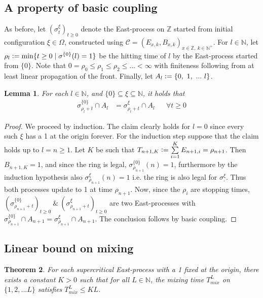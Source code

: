 \documentclass{article}
\theoremstyle{slimTheoremStyle} %
\newtheorem{theorem}{Theorem}[section]
\newtheorem{lemma}[theorem]{Lemma}
\theoremstyle{slimDefinitionStyle}
\theoremstyle{remark}
\renewcommand{\cal}[1]{\mathcal{#1}}
\newcommand{\N}{\mathbb{N}}
\newcommand{\Z}{\mathbb{Z}}
\newcommand{\defeq}{\vcentcolon=}
\begin{document}
\subsection{A property of basic coupling}
As before, let $(\sigma^\xi_t)_{t \geq 0}$ denote the East-process on $\Z$ started from initial configuration $\xi \in \Omega$, constructed using $\cal{C} = (E_{x,k}, B_{x,k})_{x \in \Z,\ k \in \N^+}$. For $l \in \N$, let $\rho_l \defeq \min\{ t \geq 0 \mid \sigma^{\{0\}}(l) = 1\}$ be the hitting time of $l$ by the East-process started from $\{ 0 \}$. Note that $0 = \rho_0 \leq \rho_1 \leq \rho_2 \leq ... < \infty$ with finiteness following from at least linear propagation of the front. Finally, let $A_l \defeq \{0,\ 1,\ ...\ l \}$.  

\begin{lemma}\label{lem:East_linear_coupling}
For each $l \in \N$, and $\{0\} \subseteq \xi \subseteq \N$, it holds that 
\begin{align}
\sigma^{\{0\}}_{\rho_l + t} \cap A_l &= \sigma^\xi_{\rho_l + t} \cap A_l &&\forall t \geq 0
\end{align}
\end{lemma}

\begin{proof}
We proceed by induction. The claim clearly holds for $l=0$ since every such $\xi$ has a 1 at the origin forever. For the induction step suppose that the claim holds up to $l=n \geq 1$. Let $K$ be such that $T_{n+1, K} \defeq \sum\limits^{K}_{i=1} E_{n+1, i} = \rho_{n+1}$. Then $B_{n+1, K}=1$, and since the ring is legal, $\sigma^{\{0\}}_{\rho_{n+1}}(n) = 1$, furthermore by the induction hypothesis also $\sigma^\xi_{\rho_{n+1}}(n) = 1$ i.e. the ring is also legal for $\sigma^\xi_.$. Thus both processes update to 1 at time $\rho_{n+1}$. Now, since the $\rho_i$ are stopping times, $(\sigma^{\{0\}}_{\rho_{n+1}+t})_{t \geq 0}\ \&\ (\sigma^\xi_{\rho_{n+1} + t})_{t \geq 0}$ are two East-processes with $\sigma^{\{0\}}_{\rho_{n+1}} \cap A_{n+1} = \sigma^\xi_{\rho_{n+1}} \cap A_{n+1}$. The conclusion follows by basic coupling. 
\end{proof}

\subsection{Linear bound on mixing}
\begin{theorem}
For each supercritical East-process with a 1 fixed at the origin, there exists a constant $K > 0$ such that for all $L \in \N$, the mixing time $T^L_{mix}$ on $\{1, 2, ... L\}$ satisfies $T^L_{mix} \leq KL$.  
\end{theorem}
\end{document}
